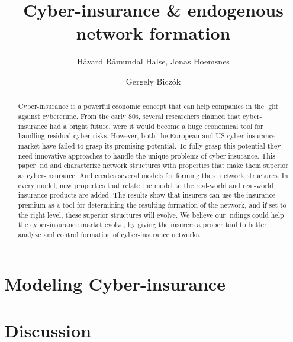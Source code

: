 \documentclass{llncs}
\begin{document}
\title{Cyber-insurance \& endogenous network formation}

\author{Håvard Råmundal Halse, Jonas Hoemsnes \and Gergely Biczók}


\maketitle
%

\begin{abstract}
Cyber-insurance is a powerful economic concept that can
help companies in the ght against cybercrime. From the early 80s, several
researchers claimed that cyber-insurance had a bright future, were it
would become a huge economical tool for handling residual cyber-risks.
However, both the European and US cyber-insurance market have failed
to grasp its promising potential. To fully grasp this potential they need
innovative approaches to handle the unique problems of cyber-insurance.
This paper nd and characterize network structures with properties that
make them superior as cyber-insurance. And creates several models for
forming these network structures. In every model, new properties that
relate the model to the real-world and real-world insurance products are
added. The results show that insurers can use the insurance premium as
a tool for determining the resulting formation of the network, and if set
to the right level, these superior structures will evolve.
We believe our ndings could help the cyber-insurance market evolve, by
giving the insurers a proper tool to better analyze and control formation
of cyber-insurance networks.
\end{abstract}
%



\section{Modeling Cyber-insurance}


\section{Discussion}
\end{document}
